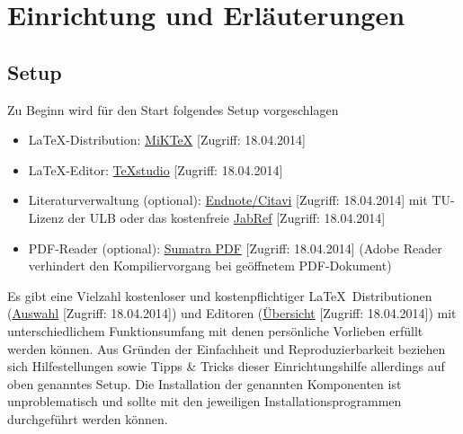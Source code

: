 \chapter{Einrichtung und Erläuterungen}
	\section{Setup}
	Zu Beginn wird für den Start folgendes Setup vorgeschlagen
	\begin{itemize}
		\item	\LaTeX-Distribution: \href{http://miktex.org/download}{MiKTeX} [Zugriff: 18.04.2014]
		\item	\LaTeX-Editor: \href{http://texstudio.sourceforge.net/}{TeXstudio} [Zugriff: 18.04.2014]
		\item	Literaturverwaltung (optional): \href{http://www.ulb.tu-darmstadt.de/service/literaturverwaltung/index.de.jsp}{Endnote/Citavi} [Zugriff: 18.04.2014] mit TU-Lizenz der ULB oder das kostenfreie \href{http://jabref.sourceforge.net/download.php}{JabRef} [Zugriff: 18.04.2014]
		\item	PDF-Reader (optional): \href{http://blog.kowalczyk.info/software/sumatrapdf/download-free-pdf-viewer-de.html}{Sumatra PDF} [Zugriff: 18.04.2014] (Adobe Reader verhindert den Kompiliervorgang bei geöffnetem PDF-Dokument)
	\end{itemize}
	Es gibt eine Vielzahl kostenloser und kostenpflichtiger \LaTeX\ Distributionen (\href{http://www.tug.org/interest.html#free}{Auswahl} [Zugriff: 18.04.2014]) und Editoren (\href{http://en.wikipedia.org/wiki/Comparison_of_TeX_editors}{Übersicht} [Zugriff: 18.04.2014]) mit unterschiedlichem Funktionsumfang mit denen persönliche Vorlieben erfüllt werden können.
	Aus Gründen der Einfachheit und Reproduzierbarkeit beziehen sich Hilfestellungen sowie Tipps \& Tricks dieser Einrichtungshilfe allerdings auf oben genanntes Setup. Die Installation der genannten Komponenten ist unproblematisch und sollte mit den jeweiligen Installationsprogrammen durchgeführt werden können.
